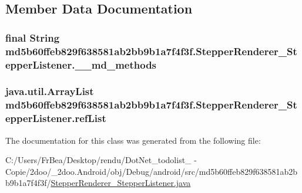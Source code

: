 \subsection{Member Data Documentation}
\hypertarget{classmd5b60ffeb829f638581ab2bb9b1a7f4f3f_1_1_stepper_renderer___stepper_listener_477983b1cb4ddb1d26a31bca1d1d5f02}{
\subsubsection[{\_\-\_\-md\_\-methods}]{\setlength{\rightskip}{0pt plus 5cm}final String {\bf md5b60ffeb829f638581ab2bb9b1a7f4f3f.StepperRenderer\_\-StepperListener.\_\-\_\-md\_\-methods}}}
\label{classmd5b60ffeb829f638581ab2bb9b1a7f4f3f_1_1_stepper_renderer___stepper_listener_477983b1cb4ddb1d26a31bca1d1d5f02}


\hypertarget{classmd5b60ffeb829f638581ab2bb9b1a7f4f3f_1_1_stepper_renderer___stepper_listener_7b30f64618d4b4b7a77c41568e675599}{
\subsubsection[{refList}]{\setlength{\rightskip}{0pt plus 5cm}java.util.ArrayList {\bf md5b60ffeb829f638581ab2bb9b1a7f4f3f.StepperRenderer\_\-StepperListener.refList}}}
\label{classmd5b60ffeb829f638581ab2bb9b1a7f4f3f_1_1_stepper_renderer___stepper_listener_7b30f64618d4b4b7a77c41568e675599}




The documentation for this class was generated from the following file:\begin{CompactItemize}
\item 
C:/Users/FrBea/Desktop/rendu/DotNet\_\-todolist\_ - Copie/2doo/\_\-2doo.Android/obj/Debug/android/src/md5b60ffeb829f638581ab2bb9b1a7f4f3f/\hyperlink{_stepper_renderer___stepper_listener_8java}{StepperRenderer\_\-StepperListener.java}\end{CompactItemize}

